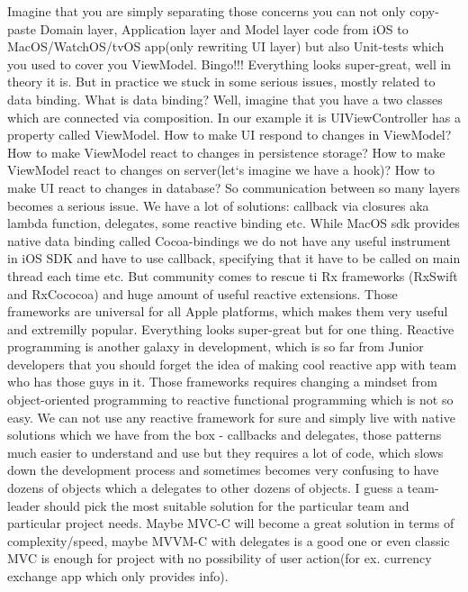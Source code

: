 Imagine that you are simply separating those concerns you can not only copy-paste Domain layer, Application layer and Model layer code from iOS to MacOS/WatchOS/tvOS app(only rewriting UI layer) but also Unit-tests which you used to cover you ViewModel. Bingo!!! Everything looks super-great, well in theory it is. But in practice we stuck in some serious issues, mostly related to data binding. What is data binding? Well, imagine that you have a two classes which are connected via composition. In our example it is UIViewController has a property called ViewModel. How to make UI respond to changes in ViewModel? How to make ViewModel react to changes in persistence storage? How to make ViewModel react to changes on server(let`s imagine we have a hook)? How to make UI react to changes in database? So communication between so many layers becomes a serious issue. We have a lot of solutions: callback via closures aka lambda function, delegates, some reactive binding etc. While MacOS sdk provides native data binding called Cocoa-bindings we do not have any useful instrument in iOS SDK and have to use callback, specifying that it have to be called on main thread each time etc. But community comes to rescue ti Rx frameworks (RxSwift and RxCococoa) and huge amount of useful reactive extensions. Those frameworks are universal for all Apple platforms, which makes them very useful and extremilly popular. Everything looks super-great but for one thing. Reactive programming is another  galaxy in development, which is so far from Junior developers that you should forget the idea of making cool reactive app with team who has those guys in it. Those frameworks requires changing a mindset from object-oriented programming to reactive functional programming which is not so easy. We can not use any reactive framework for sure and simply live with native solutions which we have from the box - callbacks and delegates, those patterns much easier to understand and use but they requires a lot of code, which slows down the development process and sometimes becomes very confusing to have dozens of objects which a delegates to other dozens of objects. I guess a team-leader should pick the most suitable solution for the particular team and particular project needs. Maybe MVC-C will become a great solution in terms of complexity/speed, maybe MVVM-C with delegates is a good one or even classic MVC is enough for project with no possibility of user action(for ex. currency exchange app which only provides info).
